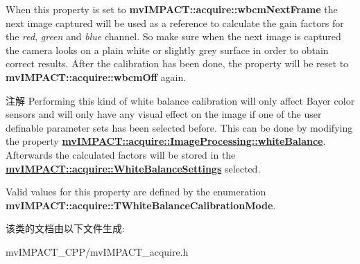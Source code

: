 When this property is set to {\bfseries mv\+I\+M\+P\+A\+C\+T\+::acquire\+::wbcm\+Next\+Frame} the next image captured will be used as a reference to calculate the gain factors for the {\itshape red}, {\itshape green} and {\itshape blue} channel. So make sure when the next image is captured the camera looks on a plain white or slightly grey surface in order to obtain correct results. After the calibration has been done, the property will be reset to {\bfseries mv\+I\+M\+P\+A\+C\+T\+::acquire\+::wbcm\+Off} again.

\begin{DoxyNote}{注解}
Performing this kind of white balance calibration will only affect Bayer color sensors and will only have any visual effect on the image if one of the user definable parameter sets has been selected before. This can be done by modifying the property {\bfseries \hyperlink{classmv_i_m_p_a_c_t_1_1acquire_1_1_image_processing_afc417e7cc989db27966d9b267d337e0f}{mv\+I\+M\+P\+A\+C\+T\+::acquire\+::\+Image\+Processing\+::white\+Balance}}. Afterwards the calculated factors will be stored in the {\bfseries \hyperlink{classmv_i_m_p_a_c_t_1_1acquire_1_1_white_balance_settings}{mv\+I\+M\+P\+A\+C\+T\+::acquire\+::\+White\+Balance\+Settings}} selected.
\end{DoxyNote}
Valid values for this property are defined by the enumeration {\bfseries mv\+I\+M\+P\+A\+C\+T\+::acquire\+::\+T\+White\+Balance\+Calibration\+Mode}. 

该类的文档由以下文件生成\+:\begin{DoxyCompactItemize}
\item 
mv\+I\+M\+P\+A\+C\+T\+\_\+\+C\+P\+P/mv\+I\+M\+P\+A\+C\+T\+\_\+acquire.\+h\end{DoxyCompactItemize}
